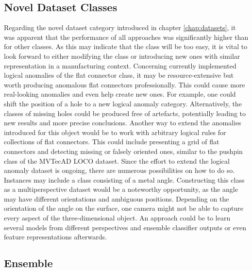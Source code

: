 \subsection{Novel Dataset Classes}
\label{subsec:FCoutlook}
Regarding the novel dataset category introduced in chapter \ref{chap:datasets}, it was apparent that the performance of all approaches was significantly higher than for other classes. 
As this may indicate that the class will be too easy, it is vital to look forward to either modifying the class or introducing new ones with similar representation in a 
manufacturing context. \newline
Concerning currently implemented logical anomalies of the flat connector class, it may be resource-extensive but worth producing anomalous flat connectors professionally. This 
could cause more real-looking anomalies and even help create new ones. For example, one could shift the position of a hole to a new logical anomaly category. Alternatively, the classes 
of missing holes could be produced free of artefacts, potentially leading to new results and more precise conclusions. Another way to extend the anomalies introduced for this 
object would be to work with arbitrary logical rules for collections of flat connectors. This could include presenting a grid of flat connectors and detecting missing or falsely 
oriented ones, similar to the pushpin class of the MVTecAD LOCO \cite{LOCODentsAndScratchesBergmann2022} dataset.\newline 
Since the effort to extend the logical anomaly dataset is ongoing, there are numerous possibilities on how to do so. Instances may include a class consisting of a metal angle. 
Constructing this class as a multiperspective dataset would be a noteworthy opportunity, as the angle may have different orientations and ambiguous positions. Depending 
on the orientation of the angle on the surface, one camera might not be able to capture every aspect of the three-dimensional object. An approach could be to learn several models 
from different perspectives and ensemble classifier outputs or even feature representations afterwards.

\subsection{Ensemble}
\label{subsec:ensembleconc}

